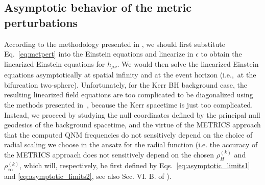 \documentclass[aps,prx,amsmath,floats,floatfix,twocolumn,
  superscriptaddress,nofootinbib,showpacs]{revtex4-1}
\begin{document}
\subsection{Asymptotic behavior of the metric perturbations}
\label{sec:ansatz}

According to the methodology presented in \cite{Chung:2023zdq}, we should first substitute Eq.~\eqref{eq:metpert} into the Einstein equations and linearize in $\epsilon$ to obtain the linearized Einstein equations for $h_{\mu \nu}$. We would then solve the linearized Einstein equations asymptotically at spatial infinity and at the event horizon (i.e.,~at the bifurcation two-sphere).
Unfortunately, for the Kerr BH background case, the resulting linearized field equations are too complicated to be diagonalized using the methods presented in~\cite{Langlois:2021xzq}, because the Kerr spacetime is just too complicated.
Instead, we proceed by studying the null coordinates defined by the principal null geodesics of the background spacetime, and the virtue of the METRICS approach that the computed QNM frequencies do not sensitively depend on the choice of radial scaling we choose in the ansatz for the radial function (i.e. the accuracy of the METRICS approach does not sensitively depend on the chosen $ \rho_H^{(k)}$ and $\rho_{\infty}^{(k)}$, which will, respectively, be first defined by Eqs.~\eqref{eq:asymptotic_limits1} and \eqref{eq:asymptotic_limits2}, see also Sec. VI. B. of \cite{Chung:2023zdq}).
\end{document}
